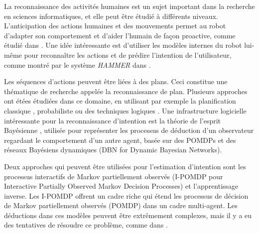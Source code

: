 \documentclass[a4paper,11pt,twoside]{StyleThese}
\begin{document}
La reconnaissance des activités humaines est un sujet important dans la recherche en sciences informatiques, et elle peut être étudié à différents niveaux. L'anticipation des actions humaines et des mouvements permet au robot d'adapter son comportement et d'aider l'humain de façon proactive, comme étudié dans \cite{koppula2013anticipating}. Une idée intéressante est d'utiliser les modèles internes du robot lui-même pour reconnaître les actions et de prédire l'intention de l'utilisateur, comme montré par le système \textit{HAMMER} dans \cite{demiris2007prediction}. 

Les séquences d'actions peuvent être liées à des plans. Ceci constitue une thématique de recherche appelée la reconnaissance de plan. Plusieurs approches ont étées étudiées dans ce domaine, en utilisant par exemple la planification classique \cite{ramirez2009plan}, probabiliste \cite{bui2003general} ou des techniques logiques \cite{singla2011abductive}. Une infrastructure logicielle intéressante pour la reconnaissance d'intention est la théorie de l'esprit Bayésienne \cite{baker2014modeling}, utilisée pour représenter les processus de déduction d'un observateur regardant le comportement d'un autre agent, basée sur des POMDPs et des réseaux Bayésiens dynamiques (DBN for Dynamic Bayesian Networks).

Deux approches qui peuvent être utilisées pour l'estimation d'intention sont les processus interactifs de Markov partiellement observés (I-POMDP pour Interactive Partially Observed Markov Decision Processes) et l'apprentissage inverse. Les I-POMDP \cite{gmytrasiewicz2004interactive} offrent un cadre riche qui étend les processus de décision de Markov partiellement observés (POMDP) dans un cadre multi-agent. Les déductions dans ces modèles peuvent être extrêmement complexes, mais il y a eu des tentatives de résoudre ce problème, comme dans \cite{doshi2009monte, hoang2013interactive}.



\end{document}
